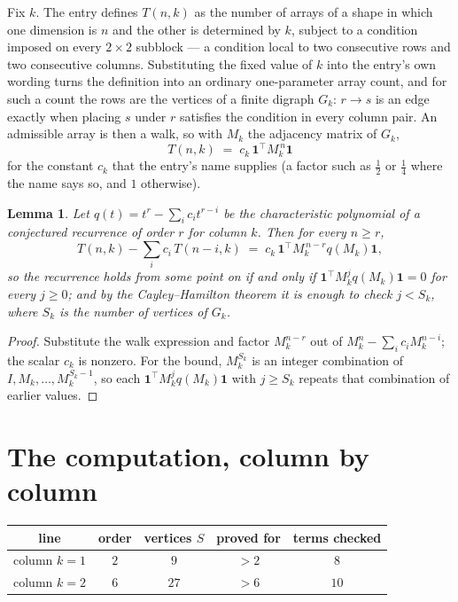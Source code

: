 \documentclass[11pt,a4paper]{article}
\theoremstyle{plain}
\newtheorem{lemma}[theorem]{Lemma}
\theoremstyle{definition}
\begin{document}
Fix $k$. The entry defines $T(n,k)$ as the number of arrays of a shape in which one dimension
is $n$ and the other is determined by $k$, subject to a condition imposed on every
$2\times2$ subblock --- a condition local to two consecutive rows and two consecutive columns.
Substituting the fixed value of $k$ into the entry's own wording turns the definition into an
ordinary one-parameter array count, and for such a count the rows are the vertices of a finite
digraph $G_k$: $r\to s$ is an edge exactly when placing $s$ under $r$ satisfies the condition
in every column pair. An admissible array is then a walk, so with $M_k$ the adjacency matrix
of $G_k$,
\[
T(n,k)\;=\;c_k\,\mathbf{1}^{\!\top}M_k^{\,n}\mathbf{1}
\]
for the constant $c_k$ that the entry's name supplies (a factor such as $\tfrac12$ or
$\tfrac14$ where the name says so, and $1$ otherwise).

\begin{lemma}\label{lem:crit}
Let $q(t)=t^{r}-\sum_i c_it^{r-i}$ be the characteristic polynomial of a conjectured
recurrence of order $r$ for column $k$. Then for every $n\ge r$,
\[
T(n,k)-\sum_i c_i\,T(n-i,k)\;=\;c_k\,\mathbf{1}^{\!\top}M_k^{\,n-r}q(M_k)\mathbf{1},
\]
so the recurrence holds from some point on if and only if
$\mathbf{1}^{\!\top}M_k^{j}q(M_k)\mathbf{1}=0$ for every $j\ge0$; and by the
Cayley--Hamilton theorem it is enough to check $j<S_k$, where $S_k$ is the number of vertices
of $G_k$.
\end{lemma}

\begin{proof}
Substitute the walk expression and factor $M_k^{n-r}$ out of $M_k^{n}-\sum_ic_iM_k^{n-i}$;
the scalar $c_k$ is nonzero. For the bound, $M_k^{S_k}$ is an integer combination of
$I,M_k,\dots,M_k^{S_k-1}$, so each $\mathbf{1}^{\!\top}M_k^{j}q(M_k)\mathbf{1}$ with
$j\ge S_k$ repeats that combination of earlier values.
\end{proof}

\section{The computation, column by column}

\begin{center}
\begin{tabular}{ccccc}
line & order & vertices $S$ & proved for & terms checked \\ \hline
column $k$$=1$ & $2$ & $9$ & $>2$ & $8$ \\
column $k$$=2$ & $6$ & $27$ & $>6$ & $10$ \\
\end{tabular}
\end{center}
\end{document}
